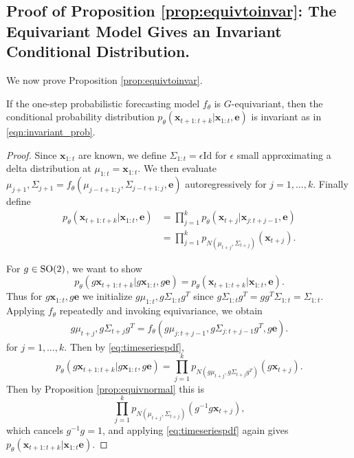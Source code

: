 \subsection{Proof of Proposition \ref{prop:equivtoinvar}: The Equivariant Model Gives an Invariant Conditional Distribution. }


We now prove Proposition \ref{prop:equivtoinvar}.

\begin{prop*}
If the one-step probabilistic forecasting model $f_\theta$ is $G$-equivariant, then the conditional probability distribution $p_\theta( \mathbf{x}_{t+1:t+k} | \mathbf{x}_{1:t}, \mathbf{e})$ is invariant as in \autoref{eqn:invariant_prob}.
\end{prop*}

\begin{proof}
Since $\mathbf{x}_{1:t}$ are known, we define $\Sigma_{1:t} = \epsilon \mathrm{Id}$ for $\epsilon$ small approximating a delta distribution at $\mu_{1:t} = \mathbf{x}_{1:t}$.
We then evaluate $\mu_{j+1},\Sigma_{j+1} = f_\theta(\mu_{j-t+1:j}, \Sigma_{j-t+1:j}, \mathbf{e})$ autoregressively for $j=1,\ldots,k$.  Finally define 
\begin{equation}
\begin{aligned}
    p_\theta( \mathbf{x}_{t+1:t+k} | \mathbf{x}_{1:t}, \mathbf{e}) &=
    \prod_{j=1}^k  p_\theta( \mathbf{x}_{t+j} | \mathbf{x}_{j:t+j-1}, \mathbf{e}) \\
    &= \prod_{j=1}^k p_{N(\mu_{t+j},\Sigma_{t+j})}(\mathbf{x}_{t+j}). 
\end{aligned}
\label{eq:timeseriespdf}
\end{equation}

For $g \in \mathrm{SO}(2)$, we want to show 
\[
    p_\theta( g\mathbf{x}_{t+1:t+k} | g\mathbf{x}_{1:t}, g\mathbf{e}) = p_\theta( \mathbf{x}_{t+1:t+k} | \mathbf{x}_{1:t}, \mathbf{e}).
\]
  Thus for $g\mathbf{x}_{1:t}, g\mathbf{e}$ we initialize $g \mu_{1:t},g\Sigma_{1:t}g^{T}$ since $g\Sigma_{1:t}g^T = gg^T\Sigma_{1:t}= \Sigma_{1:t}$. Applying $f_\theta$ repeatedly and invoking equivariance, we obtain 
\begin{align}
    g\mu_{t+j},g\Sigma_{t+j}g^{T} = f_\theta(g\mu_{j:t+j-1}, g\Sigma_{j:t+j-1}g^{T}, g\mathbf{e}). 
\end{align}
for $j =1,\ldots,k$.  Then by \autoref{eq:timeseriespdf}, 
\[
    p_\theta( g\mathbf{x}_{t+1:t+k} | g\mathbf{x}_{1:t}, g\mathbf{e}) =
    \prod_{j=1}^k p_{N(g\mu_{t+j},g\Sigma_{t+j}g^{T})}(g\mathbf{x}_{t+j}).
\]
Then by Proposition \ref{prop:equivnormal} this is 
\[
  \prod_{j=1}^k p_{N(\mu_{t+j},\Sigma_{t+j})}(g^{-1}g\mathbf{x}_{t+j}),
\]
which cancels $g^{-1}g = 1$, and applying \autoref{eq:timeseriespdf} again gives  $p_\theta( \mathbf{x}_{t+1:t+k} | \mathbf{x}_{1:t} \mathbf{e})$.  
\end{proof}



